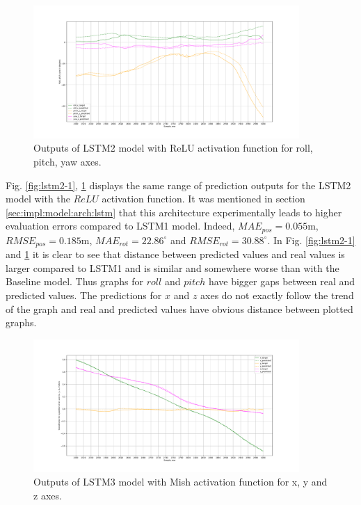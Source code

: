 \begin{figure}
	\begin{center}
		\includegraphics[width=0.9\textwidth, keepaspectratio]{gfx/lstm2_relu-roll_pitch_yaw.pdf}
		\caption{\label{fig:lstm2-2} Outputs of LSTM2 model with ReLU activation function for roll, pitch, yaw axes.}
	\end{center}
\end{figure}

Fig. \ref{fig:lstm2-1}, \ref{fig:lstm2-2} displays the same range of prediction outputs for the LSTM2 model with the $ReLU$ activation function. It was mentioned in section \ref{sec:impl:model:arch:lstm} that this architecture experimentally leads to higher evaluation errors compared to LSTM1 model. Indeed,  $MAE_{pos} = 0.055$m, $RMSE_{pos} = 0.185$m, $MAE_{rot} = 22.86^{\circ}$ and $RMSE_{rot}  =30.88^{\circ}$. In Fig. \ref{fig:lstm2-1} and \ref{fig:lstm2-2} it is clear to see that distance between predicted values and real values is larger compared to LSTM1 and is similar and somewhere worse than with the Baseline model. Thus graphs for $roll$ and $pitch$ have bigger gaps between real and predicted values. The predictions for $x$ and $z$ axes do not exactly follow the trend of the graph and real and predicted values have obvious distance between plotted graphs. 

\begin{figure}[t!]
	\begin{center}
		\includegraphics[width=0.9\textwidth, keepaspectratio]{gfx/lstm3_mish-xyz_position.pdf}
		\caption{\label{fig:lstm3-1} Outputs of LSTM3 model with Mish activation function for x, y and z axes.}
	\end{center}
\end{figure}


